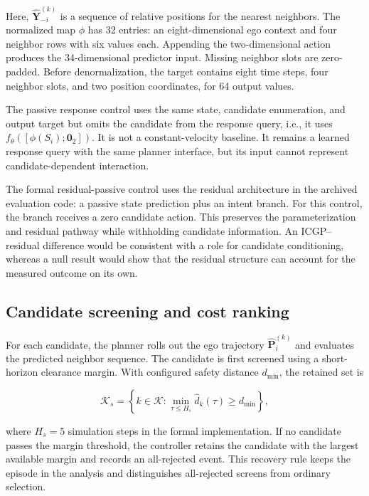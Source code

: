 \documentclass[pdflatex,sn-mathphys-num]{sn-jnl}
\begin{document}
Here, $\widehat{\mathbf{Y}}_{-i}^{(k)}$ is a sequence of relative positions for the nearest neighbors. The normalized map $\phi$ has 32 entries: an eight-dimensional ego context and four neighbor rows with six values each. Appending the two-dimensional action produces the 34-dimensional predictor input. Missing neighbor slots are zero-padded. Before denormalization, the target contains eight time steps, four neighbor slots, and two position coordinates, for 64 output values.

The passive response control uses the same state, candidate enumeration, and output target but omits the candidate from the response query, i.e., it uses $f_{\theta}([\phi(S_i);\mathbf{0}_2])$. It is not a constant-velocity baseline. It remains a learned response query with the same planner interface, but its input cannot represent candidate-dependent interaction.

The formal residual-passive control uses the residual architecture in the archived evaluation code: a passive state prediction plus an intent branch. For this control, the branch receives a zero candidate action. This preserves the parameterization and residual pathway while withholding candidate information. An ICGP--residual difference would be consistent with a role for candidate conditioning, whereas a null result would show that the residual structure can account for the measured outcome on its own.

\subsection{Candidate screening and cost ranking}

For each candidate, the planner rolls out the ego trajectory $\widehat{\mathbf{P}}_i^{(k)}$ and evaluates the predicted neighbor sequence. The candidate is first screened using a short-horizon clearance margin. With configured safety distance $d_{\min}$, the retained set is

\begin{equation}
\mathcal{K}_s=\left\{k\in\mathcal{K}:\min_{\tau\leq H_s}\widehat{d}_k(\tau)\geq d_{\min}\right\},
\label{eq:screen}
\end{equation}

where $H_s=5$ simulation steps in the formal implementation. If no candidate passes the margin threshold, the controller retains the candidate with the largest available margin and records an all-rejected event. This recovery rule keeps the episode in the analysis and distinguishes all-rejected screens from ordinary selection.
\end{document}
